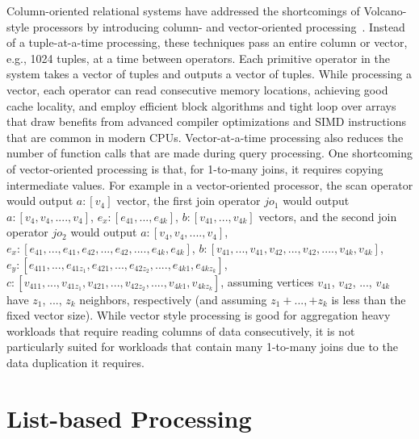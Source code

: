 Column-oriented relational systems have addressed the shortcomings of Volcano-style processors by introducing column- and vector-oriented processing~\cite{boncz-phd, monet-2decades}. Instead of a tuple-at-a-time processing, these techniques pass an entire column or vector, e.g., 1024 tuples, at a time between operators. Each primitive operator in the system takes a vector of tuples and outputs a vector of tuples. While processing a vector, each operator can read consecutive memory locations, achieving good cache locality, and employ efficient block algorithms and tight loop over arrays that draw benefits from advanced compiler optimizations and SIMD instructions that are common in modern CPUs. Vector-at-a-time processing also reduces the number of function calls that are made during query processing. One shortcoming of vector-oriented processing is that, for 1-to-many joins, it requires copying intermediate values. For example in a vector-oriented processor, the scan operator would output $a:[v_4]$ vector, the first join operator $jo_1$ would output $a:[v_4, v_4, ...., v_4]$, $e_x:[e_{41}, ..., e_{4k}]$, $b:[v_{41}, ..., v_{4k}]$ vectors, and the second join operator $jo_2$ would output $a:[v_4, v_4, ...., v_4]$, $e_x:[e_{41},...,e_{41}, e_{42}, ..., e_{42}, ...., e_{4k}, e_{4k}]$, $b:[v_{41},...,v_{41}, v_{42}, ..., v_{42}, ...., v_{4k}, v_{4k}]$, $e_y:[e_{411},...,e_{41z_1}, e_{421}, ..., e_{42z_2}, ...., e_{4k1}, e_{4kz_k}]$, $c:[v_{411},...,v_{41z_1}, v_{421}, ..., v_{42z_2}, ...., v_{4k1}, v_{4kz_k}]$, assuming vertices $v_{41}$, $v_{42}$, ..., $v_{4k}$ have $z_1$, ..., $z_k$ neighbors, respectively (and assuming $z_1 + ..., + z_k$ is less than the fixed vector size). While vector style processing is good for aggregation heavy workloads that require reading columns of data consecutively, it is not particularly suited for workloads that contain many 1-to-many joins due to the data duplication it requires.


\section{List-based Processing}
\label{sec:list-based-proc}

